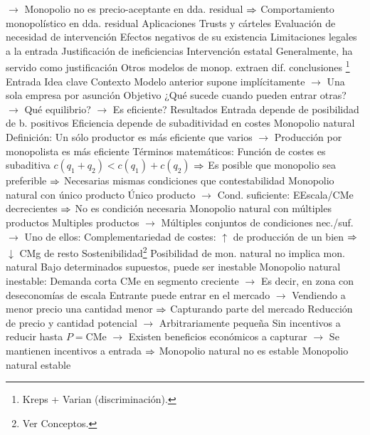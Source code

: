 \documentclass{nuevotema}
\begin{document}
\begin{esquemal}
				\4[] $\to$ Monopolio no es precio-aceptante en dda. residual
				\4[] $\Rightarrow$ Comportamiento monopolístico en dda. residual
		\2 Aplicaciones
			\3 Trusts y cárteles
				\4 Evaluación de necesidad de intervención
				\4 Efectos negativos de su existencia
			\3 Limitaciones legales a la entrada
				\4 Justificación de ineficiencias
			\3 Intervención estatal
				\4 Generalmente, ha servido como justificación
				\4 Otros modelos de monop. extraen dif. conclusiones
	\1 \footnote{Kreps + Varian (discriminación).}
		\2 Entrada
			\3 Idea clave
				\4 Contexto
				\4[] Modelo anterior supone implícitamente
				\4[] $\to$ Una sola empresa por asunción
				\4 Objetivo
				\4[] ¿Qué sucede cuando pueden entrar otras?
				\4[] $\to$ Qué equilibrio?
				\4[] $\to$ Es eficiente?
				\4 Resultados
				\4[] Entrada depende de posibilidad de b. positivos
				\4[] Eficiencia depende de subaditividad en costes
			\3 Monopolio natural
				\4 Definición:
				\4[] Un sólo productor es más eficiente que varios
				\4[] $\to$ Producción por monopolista es más eficiente
				\4[] Términos matemáticos:
				\4[] Función de costes es subaditiva
				\4[] $c(q_1 + q_2) < c(q_1) + c(q_2)$
				\4[] $\Rightarrow$ Es posible que monopolio sea preferible
				\4[] $\Rightarrow$ Necesarias mismas condiciones que contestabilidad
				\4 Monopolio natural con único producto
				\4[] Único producto
				\4[] $\to$ Cond. suficiente: EEscala/CMe decrecientes
				\4[] $\Rightarrow$ No es condición necesaria
				\4[] 
				\4 Monopolio natural con múltiples productos
				\4[] Multiples productos
				\4[] $\to$ Múltiples conjuntos de condiciones nec./suf.
				\4[] $\to$ Uno de ellos:
				\4[] Complementariedad de costes:
				\4[] $\uparrow$ de producción de un bien $\Rightarrow$ $\downarrow$ CMg de resto
				\4 Sostenibilidad\footnote{Ver Conceptos.}
				\4[] Posibilidad de mon. natural no implica mon. natural
				\4[] Bajo determinados supuestos, puede ser inestable
				\4 Monopolio natural inestable:
				\4[] Demanda corta CMe en segmento creciente
				\4[] $\to$ Es decir, en zona con deseconomías de escala
				\4[] Entrante puede entrar en el mercado
				\4[] $\to$ Vendiendo a menor precio una cantidad menor
				\4[] $\Rightarrow$ Capturando parte del mercado
				\4[] Reducción de precio y cantidad potencial
				\4[] $\to$ Arbitrariamente pequeña
				\4[] Sin incentivos a reducir hasta $P=\text{CMe}$
				\4[] $\to$ Existen beneficios económicos a capturar
				\4[] $\to$ Se mantienen incentivos a entrada
				\4[] $\Rightarrow$ Monopolio natural no es estable
				\4 Monopolio natural estable

\end{esquemal}
\end{document}

